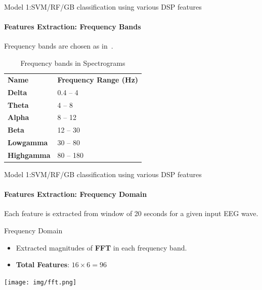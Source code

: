 \documentclass{beamer}
\begin{document}
\begin{frame}{Model 1:SVM/RF/GB classification using various DSP features}
  \framesubtitle{Features Extraction: Frequency Bands}

  Frequency bands are chosen as in~\cite{korshunova_faculty_2015}.
  
  \begin{block}{}
    \begin{table}[]
      \centering
      \caption{Frequency bands in Spectrograms}
      \begin{tabular}{ll}
        \textbf{Name}               & \textbf{Frequency Range (Hz)} \\
        \textbf{Delta}     & 0.4 -- 4                      \\
        \textbf{Theta}     & 4 -- 8                        \\
        \textbf{Alpha}     & 8 -- 12                       \\
        \textbf{Beta}      & 12 -- 30                      \\
        \textbf{Lowgamma}  & 30 -- 80                      \\
        \textbf{Highgamma} & 80 -- 180                    
      \end{tabular}
    \end{table}
  \end{block}

\end{frame}


\begin{frame}{Model 1:SVM/RF/GB classification using various DSP features}
  \framesubtitle{Features Extraction: Frequency Domain}

  Each feature is extracted from window of 20 seconds for a given input EEG
  wave.
  
  \begin{block}{Frequency Domain}
    \begin{itemize}
    \item Extracted magnitudes of \textbf{FFT} in each frequency band.
    \item \textbf{Total Features}: $16 \times 6 = 96$
    \end{itemize}
  \end{block}
  
  \begin{center}
    \texttt{[image: img/fft.png]}
  \end{center}
    
\end{frame}
\end{document}
